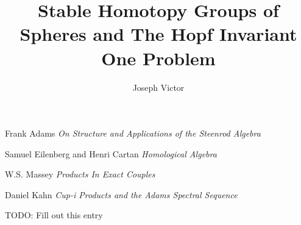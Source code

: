 \documentclass[a4paper,12pt]{article}
\begin{document}
\newcommand{\A}[0]{\mathcal{A}}
\newcommand{\Z}[0]{\mathbb{Z}}

\newtheorem{mydef}{Definition}
\newtheorem{Theorem}{Theorem}
\newtheorem{Lemma}{Lemma}



\title{Stable Homotopy Groups of Spheres and The Hopf Invariant One Problem}
\author{Joseph Victor}
\maketitle


\begin{thebibliography}{99}

  Frank Adams
  \emph{On Structure and Applications of the Steenrod Algebra}
  
  Samuel Eilenberg and Henri Cartan
  \emph{Homological Algebra}

  W.S. Massey
  \emph{Products In Exact Couples}

  Daniel Kahn
  \emph{Cup-i Products and the Adams Spectral Sequence}

  TODO: Fill out this entry

\end{thebibliography}
\end{document}
